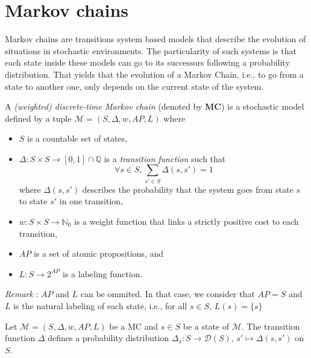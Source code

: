 \section{Markov chains}
Markov chains are transitions system based models that describe the evolution of situations in stochastic environments. The particularity of such systems is that each state inside these models can go to its successors following a probability distribution.
That yields that the evolution of a Markov Chain, i.e., to go from a state to another one, only depends on the current state of the system.
\begin{definition}
  A \textit{(weighted) discrete-time Markov chain} (denoted by \textbf{MC}) is a stochastic model defined by a tuple $\mathcal{M}=(S, \Delta, w, AP, L)$ where
	\begin{itemize}
		\item $S$ is a countable set of states,
		\item $\Delta: S \times S \rightarrow [0,1] \cap \mathbb{Q}$ is a  \textit{transition function} such that \[\forall s \in S, \sum_{s' \in S}\Delta(s, s')= 1\]
		where $\Delta(s, s')$ describes the probability that the system goes from state $s$ to state $s'$ in one transition,
    \item $w: S \times S \rightarrow \mathbb{N}_0$ %
      is a weight function that links a strictly positive cost to each transition,
    \item $AP$ is a set of atomic propositions, and
    \item $L: S \rightarrow 2^{AP}$ is a labeling function.
	\end{itemize}
  \textit{Remark }: $AP$ and $L$ can be ommited. In that case, we consider that $AP = S$ and $L$ is the natural labeling of each state, i.e., for all $s \in S$, $L(s) = \{s\}$
\end{definition}

\begin{property}
  Let $\mathcal{M} = (S, \Delta, w, AP, L)$ be a MC and $s \in S$ be a state of $\mathcal{M}$. The transition function $\Delta$ defines a probability distribution $\Delta_s: S \rightarrow \mathcal{D}(S), \, s' \mapsto \Delta(s, s')$ on $S$.
\end{property}


